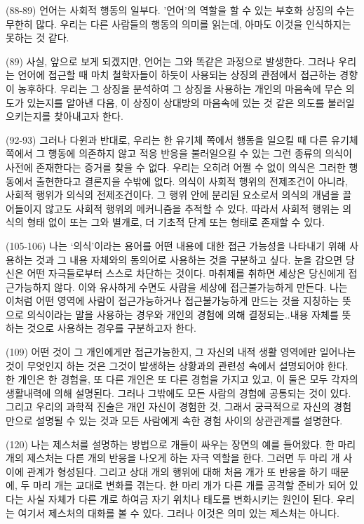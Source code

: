 \documentclass[12pt, a4paper]{article}
\begin{document}
(88-89) 언어는 사회적 행동의 일부다. '언어'의 역할을 할 수 있는 부호화 상징의 수는 무한히 많다. 우리는 다른 사람들의 행동의 의미를 읽는데, 아마도 이것을 인식하지는 못하는 것 같다. 

(89) 사실, 앞으로 보게 되겠지만, 언어는 그와 똑같은 과정으로 발생한다. 그러나 우리는 언어에 접근할 때 마치 철학자들이 하듯이 사용되는 상징의 관점에서 접근하는 경향이 농후하다. 우리는 그 상징을 분석하여 그 상징을 사용하는 개인의 마음속에 무슨 의도가 있는지를 알아낸 다음, 이 상징이 상대방의 마음속에 있는 것 같은 의도를 불러일으키는지를 찾아내고자 한다.

(92-93) 그러나 다윈과 반대로, 우리는 한 유기체 쪽에서 행동을 일으킬 때 다른 유기체 쪽에서 그 행동에 의존하지 않고 적응 반응을 불러일으킬 수 있는 그런 종류의 의식이 사전에 존재한다는 증거를 찾을 수 없다. 우리는 오히려 어쩔 수 없이 의식은 그러한 행동에서 출현한다고 결론지을 수밖에 없다. 의식이 사회적 행위의 전제조건이 아니라, 사회적 행위가 의식의 전제조건이다. 그 행위 안에 분리된 요소로서 의식의 개념을 끌어들이지 않고도 사회적 행위의 메커니즘을 추적할 수 있다. 따라서 사회적 행위는 의식의 형태 없이 또는 그와 별개로, 더 기초적 단계 또는 형태로 존재할 수 있다.

(105-106) 나는 `의식'이라는 용어를 어떤 내용에 대한 접근 가능성을 나타내기 위해 사용하는 것과 그 내용 자체와의 동의어로 사용하는 것을 구분하고 싶다. 눈을 감으면 당신은 어떤 자극들로부터 스스로 차단하는 것이다. 마취제를 취하면 세상은 당신에게 접근가능하지 않다. 이와 유사하게 수면도 사람을 세상에 접근불가능하게 만든다. 나는 이처럼 어떤 영역에 사람이 접근가능하거나 접근불가능하게 만드는 것을 지칭하는 뜻으로 의식이라는 말을 사용하는 경우와 개인의 경험에 의해 결정되는..내용 자체를 뜻하는 것으로 사용하는 경우를 구분하고자 한다.

(109) 어떤 것이 그 개인에게만 접근가능한지, 그 자신의 내적 생활 영역에만 일어나는 것이 무엇인지 하는 것은 그것이 발생하는 상황과의 관련성 속에서 설명되어야 한다. 한 개인은 한 경험을, 또 다른 개인은 또 다른 경험을 가지고 있고, 이 둘은 모두 각자의 생활내력에 의해 설명된다. 그러나 그밖에도 모든 사람의 경험에 공통되는 것이 있다. 그리고 우리의 과학적 진술은 개인 자신이 경험한 것, 그래서 궁극적으로 자신의 경험만으로 설명될 수 있는 것과 모든 사람에게 속한 경험 사이의 상관관계를 설명한다.

(120) 나는 제스처를 설명하는 방법으로 개들이 싸우는 장면의 예를 들어왔다. 한 마리 개의 제스처는 다른 개의 반응을 나오게 하는 자극 역할을 한다. 그러면 두 마리 개 사이에 관계가 형성된다. 그리고 상대 개의 행위에 대해 처음 개가 또 반응을 하기 때문에, 두 마리 개는 교대로 변화를 겪는다. 한 마리 개가 다른 개를 공격할 준비가 되어 있다는 사실 자체가 다른 개로 하여금 자기 위치나 태도를 변화시키는 원인이 된다. 우리는 여기서 제스처의 대화를 볼 수 있다. 그러나 이것은 의미 있는 제스처는 아니다.
\end{document}
